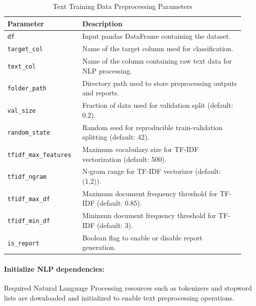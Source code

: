 \begin{table}[!htbp]
\centering
\small
\renewcommand{\arraystretch}{1.15}
\setlength{\tabcolsep}{4pt}
\caption{Text Training Data Preprocessing Parameters }
\label{tab:text_constructor_params}

\begin{tabular}{p{0.30\linewidth}p{0.65\linewidth}}
\toprule
\textbf{Parameter} & \textbf{Description} \\
\midrule

\texttt{df} &
Input pandas DataFrame containing the dataset. \\

\texttt{target\_col} &
Name of the target column used for classification. \\

\texttt{text\_col} &
Name of the column containing raw text data for NLP processing. \\

\texttt{folder\_path} &
Directory path used to store preprocessing outputs and reports. \\

\texttt{val\_size} &
Fraction of data used for validation split (default: 0.2). \\

\texttt{random\_state} &
Random seed for reproducible train-validation splitting (default: 42). \\

\texttt{tfidf\_max\_features} &
Maximum vocabulary size for TF-IDF vectorization (default: 500). \\

\texttt{tfidf\_ngram} &
N-gram range for TF-IDF vectorizer (default: (1,2)). \\

\texttt{tfidf\_max\_df} &
Maximum document frequency threshold for TF-IDF (default: 0.85). \\

\texttt{tfidf\_min\_df} &
Minimum document frequency threshold for TF-IDF (default: 3). \\

\texttt{is\_report} &
Boolean flag to enable or disable report generation. \\

\bottomrule
\end{tabular}
\end{table}
\vspace{1cm}

\paragraph{Initialize NLP dependencies:}\par
Required Natural Language Processing resources such as tokenizers and stopword lists are downloaded and initialized to enable text preprocessing operations.
\vspace{1cm}
